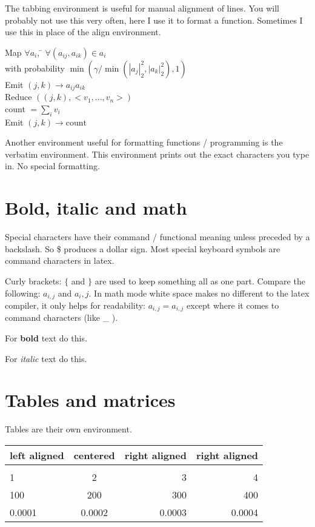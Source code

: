 \documentclass[a4paper,11pt]{article}
\begin{document}
The tabbing environment is useful for manual alignment of lines. You will probably not use this very often, here I use it to format a function. Sometimes I use this in place of the align environment.
\begin{tabbing}
Map $\forall a_i$, \= $\forall (a_{ij}, a_{ik}) \in a_i$ \\
\> with probability $\min( \gamma / \min( |a_j|_2^2, |a_k|_2^2 ) , 1)$ \\
\> Emit $(j,k) \rightarrow a_{ij} a_{ik}$ \\

Reduce $((j,k),<v_1, ..., v_n>)$ \\
\> count $= \sum_i v_i$ \\
\> Emit $(j,k) \rightarrow \text{count}$
\end{tabbing}
Another environment useful for formatting functions / programming is the verbatim environment. This environment prints out the exact characters you type in. No special formatting.

\section{Bold, italic and math}

Special characters have their command / functional meaning unless preceded by a backslash. So \$ produces a dollar sign. Most special keyboard symbols are command characters in latex.

Curly brackets: $\{$ and $\}$ are used to keep something all as one part. Compare the following: $a_{i,j}$ and $a_i,j$. In math mode white space makes no different to the latex compiler, it only helps for readability: $a_{ i  ,  j } = a_{i,j}$ except where it comes to command characters (like \_ ).

For {\bf bold} text do this.

For {\it italic} text do this.

\section{Tables and matrices}

Tables are their own environment.

\begin{tabular}{lcr|r}
left aligned & centered & right aligned & right aligned \\
\hline \\
1 & 2 & 3 & 4 \\
100 & 200 & 300 & 400 \\
0.0001 & 0.0002 & 0.0003 & 0.0004 \\
\hline
\end{tabular}
\end{document}
